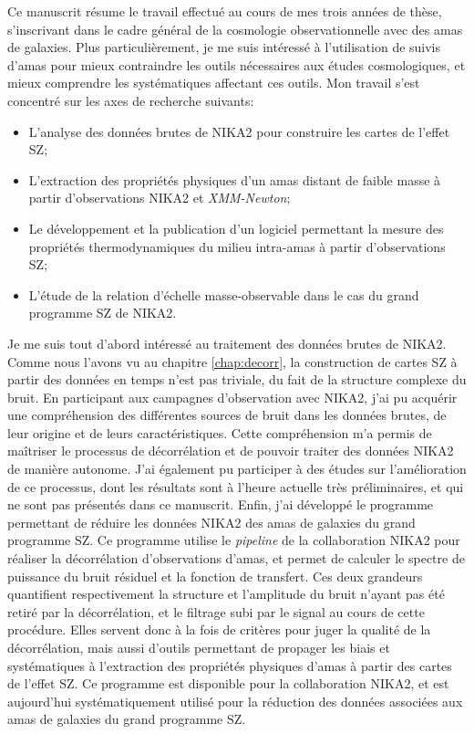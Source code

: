 Ce manuscrit résume le travail effectué au cours de mes trois années de thèse, s'inscrivant dans le cadre général de la cosmologie observationnelle avec des amas de galaxies.
Plus particulièrement, je me suis intéressé à l'utilisation de suivis d'amas pour mieux contraindre les outils nécessaires aux études cosmologiques, et mieux comprendre les systématiques affectant ces outils.
Mon travail s'est concentré sur les axes de recherche suivants:
\begin{itemize}[leftmargin=*]
\setlength\itemsep{0pt}
    \item L'analyse des données brutes de NIKA2 pour construire les cartes de l'effet SZ;
    \item L'extraction des propriétés physiques d'un amas distant de faible masse à partir d'observations NIKA2 et \textit{XMM-Newton};
    \item Le développement et la publication d'un logiciel permettant la mesure des propriétés thermodynamiques du milieu intra-amas à partir d'observations SZ;
    \item L'étude de la relation d'échelle masse-observable dans le cas du grand programme SZ de NIKA2.
\end{itemize}

Je me suis tout d'abord intéressé au traitement des données brutes de NIKA2.
Comme nous l'avons vu au chapitre \ref{chap:decorr}, la construction de cartes SZ à partir des données en temps n'est pas triviale, du fait de la structure complexe du bruit.
En participant aux campagnes d'observation avec NIKA2, j'ai pu acquérir une compréhension des différentes sources de bruit dans les données brutes, de leur origine et de leurs caractéristiques.
Cette compréhension m'a permis de maîtriser le processus de décorrélation et de pouvoir traiter des données NIKA2 de manière autonome.
J'ai également pu participer à des études sur l'amélioration de ce processus, dont les résultats sont à l'heure actuelle très préliminaires, et qui ne sont pas présentés dans ce manuscrit.
Enfin, j'ai développé le programme permettant de réduire les données NIKA2 des amas de galaxies du grand programme SZ.
Ce programme utilise le \textit{pipeline} de la collaboration NIKA2 pour réaliser la décorrélation d'observations d'amas, et permet de calculer le spectre de puissance du bruit résiduel et la fonction de transfert.
Ces deux grandeurs quantifient respectivement la structure et l'amplitude du bruit n'ayant pas été retiré par la décorrélation, et le filtrage subi par le signal au cours de cette procédure.
Elles servent donc à la fois de critères pour juger la qualité de la décorrélation, mais aussi d'outils permettant de propager les biais et systématiques à l'extraction des propriétés physiques d'amas à partir des cartes de l'effet SZ.
Ce programme est disponible pour la collaboration NIKA2, et est aujourd'hui systématiquement utilisé pour la réduction des données associées aux amas de galaxies du grand programme SZ.

